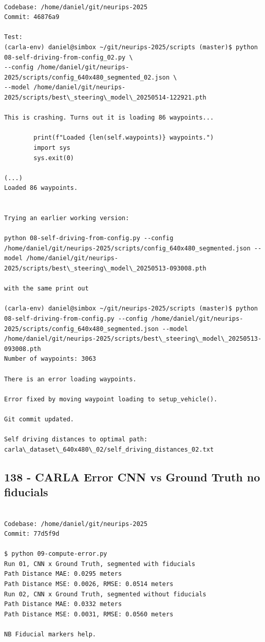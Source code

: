 \begin{verbatim}

Codebase: /home/daniel/git/neurips-2025
Commit: 46876a9

Test:
(carla-env) daniel@simbox ~/git/neurips-2025/scripts (master)$ python 08-self-driving-from-config_02.py \
--config /home/daniel/git/neurips-2025/scripts/config_640x480_segmented_02.json \
--model /home/daniel/git/neurips-2025/scripts/best\_steering\_model\_20250514-122921.pth

This is crashing. Turns out it is loading 86 waypoints...

        print(f"Loaded {len(self.waypoints)} waypoints.")
        import sys
        sys.exit(0)

(...)
Loaded 86 waypoints.


Trying an earlier working version:

python 08-self-driving-from-config.py --config /home/daniel/git/neurips-2025/scripts/config_640x480_segmented.json --model /home/daniel/git/neurips-2025/scripts/best\_steering\_model\_20250513-093008.pth

with the same print out

(carla-env) daniel@simbox ~/git/neurips-2025/scripts (master)$ python 08-self-driving-from-config.py --config /home/daniel/git/neurips-2025/scripts/config_640x480_segmented.json --model /home/daniel/git/neurips-2025/scripts/best\_steering\_model\_20250513-093008.pth
Number of waypoints: 3063

There is an error loading waypoints.

Error fixed by moving waypoint loading to setup_vehicle().

Git commit updated.

Self driving distances to optimal path:
carla\_dataset\_640x480\_02/self_driving_distances_02.txt

\end{verbatim}

\subsection{138 - CARLA Error CNN vs Ground Truth no fiducials}
\label{app_res:138}

\begin{verbatim}

Codebase: /home/daniel/git/neurips-2025
Commit: 77d5f9d

$ python 09-compute-error.py 
Run 01, CNN x Ground Truth, segmented with fiducials
Path Distance MAE: 0.0295 meters
Path Distance MSE: 0.0026, RMSE: 0.0514 meters
Run 02, CNN x Ground Truth, segmented without fiducials
Path Distance MAE: 0.0332 meters
Path Distance MSE: 0.0031, RMSE: 0.0560 meters

NB Fiducial markers help.

\end{verbatim}

